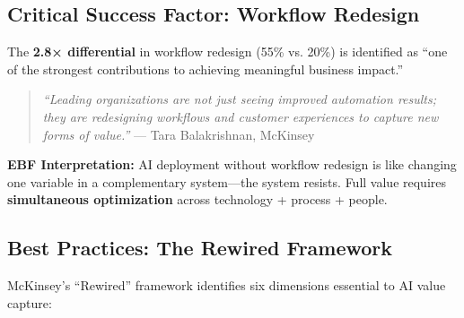 \subsection{Critical Success Factor: Workflow Redesign}

The \textbf{2.8× differential} in workflow redesign (55\% vs. 20\%) is identified as ``one of the strongest contributions to achieving meaningful business impact.''

\begin{quote}
\textit{``Leading organizations are not just seeing improved automation results; they are redesigning workflows and customer experiences to capture new forms of value.''} --- Tara Balakrishnan, McKinsey
\end{quote}

\textbf{EBF Interpretation:} AI deployment without workflow redesign is like changing one variable in a complementary system---the system resists. Full value requires \textbf{simultaneous optimization} across technology + process + people.


\subsection{Best Practices: The Rewired Framework}
\label{sec:vvv1-practices}

McKinsey's ``Rewired'' framework identifies six dimensions essential to AI value capture:

